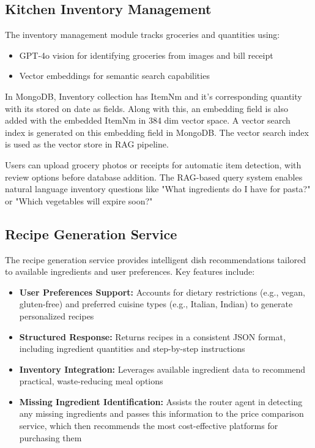 \documentclass{ecai}
\begin{document}
\subsection{Kitchen Inventory Management}

The inventory management module tracks groceries and quantities using:
\begin{itemize}[noitemsep,topsep=0pt]
    \item GPT-4o vision for identifying groceries from images and bill receipt
    \item Vector embeddings for semantic search capabilities
\end{itemize}

In MongoDB, Inventory collection has ItemNm and it’s corresponding quantity with its stored on date as fields. Along with this, an embedding field is also added with the embedded ItemNm in 384 dim vector space. A vector search index is generated on this embedding field in MongoDB. The vector search index is used as the vector store in RAG pipeline.

Users can upload grocery photos or receipts for automatic item detection, with review options before database addition. The RAG-based query system enables natural language inventory questions like "What ingredients do I have for pasta?" or "Which vegetables will expire soon?"

\subsection{Recipe Generation Service}

The recipe generation service provides intelligent dish recommendations tailored to available ingredients and user preferences. Key features include:

\begin{itemize}[noitemsep,topsep=0pt]
    \item \textbf{User Preferences Support:} Accounts for dietary restrictions (e.g., vegan, gluten-free) and preferred cuisine types (e.g., Italian, Indian) to generate personalized recipes
    \item \textbf{Structured Response:} Returns recipes in a consistent JSON format, including ingredient quantities and step-by-step instructions
    \item \textbf{Inventory Integration:} Leverages available ingredient data to recommend practical, waste-reducing meal options
    \item \textbf{Missing Ingredient Identification:} Assists the router agent in detecting any missing ingredients and passes this information to the price comparison service, which then recommends the most cost-effective platforms for purchasing them
\end{itemize}
\end{document}
